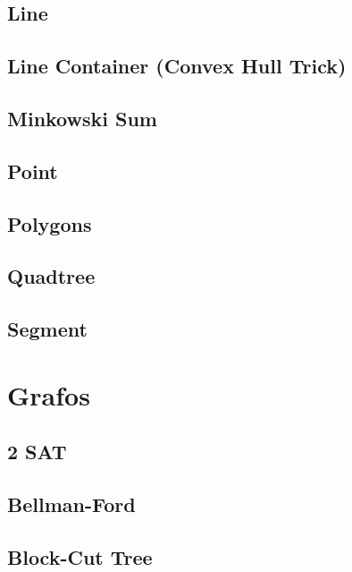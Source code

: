\subsection{Line}
\raggedbottom
\hrulefill
\subsection{Line Container (Convex Hull Trick)}
\raggedbottom
\hrulefill
\subsection{Minkowski Sum}
\raggedbottom
\hrulefill
\subsection{Point}
\raggedbottom
\hrulefill
\subsection{Polygons}
\raggedbottom
\hrulefill
\subsection{Quadtree}
\raggedbottom
\hrulefill
\subsection{Segment}
\raggedbottom
\hrulefill

\section{Grafos}
\subsection{2 SAT}
\raggedbottom
\hrulefill
\subsection{Bellman-Ford}
\raggedbottom
\hrulefill
\subsection{Block-Cut Tree}
\raggedbottom
\hrulefill

